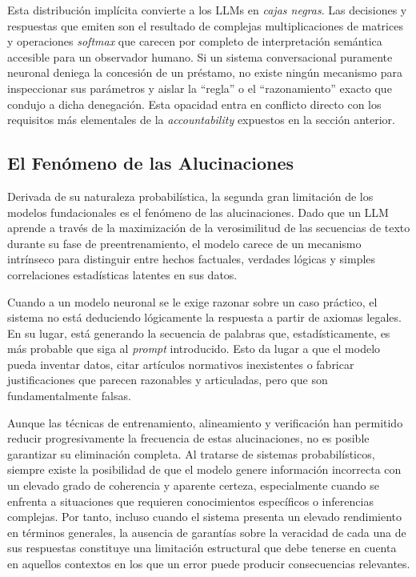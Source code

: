 \documentclass[12pt,a4paper]{report}
\begin{document}
Esta distribución implícita convierte a los LLMs en \textit{cajas negras}. Las decisiones y respuestas que emiten son el resultado de complejas multiplicaciones de matrices y operaciones \textit{softmax} que carecen por completo de interpretación semántica accesible para un observador humano. Si un sistema conversacional puramente neuronal deniega la concesión de un préstamo, no existe ningún mecanismo para inspeccionar sus parámetros y aislar la ``regla'' o el ``razonamiento'' exacto que condujo a dicha denegación. Esta opacidad entra en conflicto directo con los requisitos más elementales de la \textit{accountability} expuestos en la sección anterior.

\subsection{El Fenómeno de las Alucinaciones}

Derivada de su naturaleza probabilística, la segunda gran limitación de los modelos fundacionales es el fenómeno de las alucinaciones. Dado que un LLM aprende a través de la maximización de la verosimilitud de las secuencias de texto durante su fase de preentrenamiento, el modelo carece de un mecanismo intrínseco para distinguir entre hechos factuales, verdades lógicas y simples correlaciones estadísticas latentes en sus datos.

Cuando a un modelo neuronal se le exige razonar sobre un caso práctico, el sistema no está deduciendo lógicamente la respuesta a partir de axiomas legales. En su lugar, está generando la secuencia de palabras que, estadísticamente, es más probable que siga al \textit{prompt} introducido. Esto da lugar a que el modelo pueda inventar datos, citar artículos normativos inexistentes o fabricar justificaciones que parecen razonables y articuladas, pero que son fundamentalmente falsas.

Aunque las técnicas de entrenamiento, alineamiento y verificación han permitido reducir progresivamente la frecuencia de estas alucinaciones, no es posible garantizar su eliminación completa. Al tratarse de sistemas probabilísticos, siempre existe la posibilidad de que el modelo genere información incorrecta con un elevado grado de coherencia y aparente certeza, especialmente cuando se enfrenta a situaciones que requieren conocimientos específicos o inferencias complejas. Por tanto, incluso cuando el sistema presenta un elevado rendimiento en términos generales, la ausencia de garantías sobre la veracidad de cada una de sus respuestas constituye una limitación estructural que debe tenerse en cuenta en aquellos contextos en los que un error puede producir consecuencias relevantes.
\end{document}
